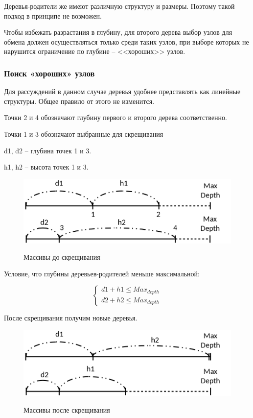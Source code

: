 Деревья-родители же имеют различную структуру и размеры. Поэтому такой подход в принципе не возможен. 

Чтобы избежать разрастания в глубину, для второго дерева выбор узлов для обмена должен осуществляться только среди таких узлов, при выборе которых не нарушится ограничение по глубине -- <<хороших>> узлов.

\subsubsection{Поиск «хороших» узлов}

Для рассуждений в данном случае деревья удобнее представлять как линейные структуры. Общее правило от этого не изменится.

Точки 2 и 4 обозначают глубину первого и второго дерева соответственно.

Точки 1 и 3 обозначают выбранные для скрещивания 

d1, d2 -- глубина точек 1 и 3.

h1, h2 -- высота точек 1 и 3.

\begin{figure}[!h]
\centering
\includegraphics[scale=0.6]{research/pics/6.png}
\label{figure:arrayGoodNodes1}
\caption{Массивы до скрещивания}
\end{figure}

Условие, что глубины деревьев-родителей меньше максимальной:

\begin{equation}
\label{equation:goodNodesEq1}
\begin{cases} d1 + h1 \leq Max_{depth} \\ d2 + h2 \leq Max_{depth} \end{cases}
\end{equation}

После скрещивания получим новые деревья. 

\begin{figure}[!h]
\centering
\includegraphics[scale=0.6]{research/pics/7.png}
\label{figure:arrayGoodNodes2}
\caption{Массивы после скрещивания}
\end{figure}

